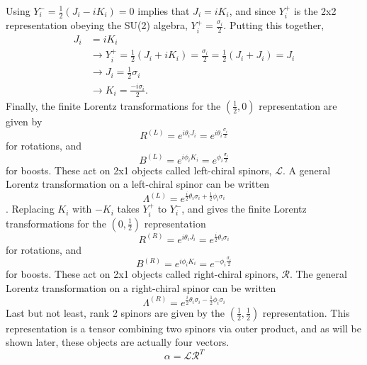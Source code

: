 Using $Y_{i}^{-} = \frac{1}{2}(J_i - iK_i) = 0$ implies that $J_i = iK_i$, and since $Y_{i}^{+}$ is the 2x2 representation obeying the SU(2) algebra, $Y_{i}^{+} = \frac{\sigma_i}{2}$. Putting this together,
\begin{equation}
\begin{split}
J_i &= iK_i \\ 
&\rightarrow Y^+_i = \frac{1}{2}(J_i + iK_i) = \frac{\sigma_i}{2} = \frac{1}{2}(J_i + J_i) = J_i \\
&\rightarrow J_i = \frac{1}{2}\sigma_i \\
&\rightarrow K_i = \frac{-i\sigma_i}{2}.
\end{split}
\end{equation} 
Finally, the finite Lorentz transformations for the $(\frac{1}{2}, 0)$ representation are given by 
\begin{equation}
R^{(L)} = e^{i\theta_i J_i} = e^{i\theta_i \frac{\sigma_i}{2}}   
\end{equation}
for rotations, and
\begin{equation}
B^{(L)} = e^{i\phi_i K_i} = e^{\phi_i \frac{\sigma_i}{2}}   
\end{equation}
for boosts. These act on 2x1 objects called left-chiral spinors, $\mathcal{L}$. A general Lorentz transformation on a left-chiral spinor can be written
\begin{equation}
\Lambda^{(L)} = e^{\frac{i}{2}\theta_i \sigma_i + \frac{1}{2}\phi_i \sigma_i}
\end{equation}.
Replacing $K_i$ with $-K_i$ takes $Y^+_i$ to $Y^-_i$, and gives the finite Lorentz transformations for the $(0, \frac{1}{2})$ representation 
\begin{equation}
R^{(R)} = e^{i\theta_i J_i} = e^{\frac{i}{2}\theta_i \sigma_i}   
\end{equation}
for rotations, and
\begin{equation}
B^{(R)} = e^{i\phi_i K_i} = e^{-\phi_i \frac{\sigma_i}{2}}   
\end{equation}
for boosts. These act on 2x1 objects called right-chiral spinors, $\mathcal{R}$. The general Lorentz transformation on a right-chiral spinor can be written
\begin{equation}
\Lambda^{(R)} = e^{\frac{i}{2}\theta_i \sigma_i - \frac{1}{2}\phi_i \sigma_i}
\end{equation}
Last but not least, rank 2 spinors are given by the $(\frac{1}{2}, \frac{1}{2})$ representation. This representation is a tensor combining two spinors via outer product, and as will be shown later, these objects are actually four vectors.
\begin{equation}
\alpha = \mathcal{L} \mathcal{R}^{T}
\end{equation}

